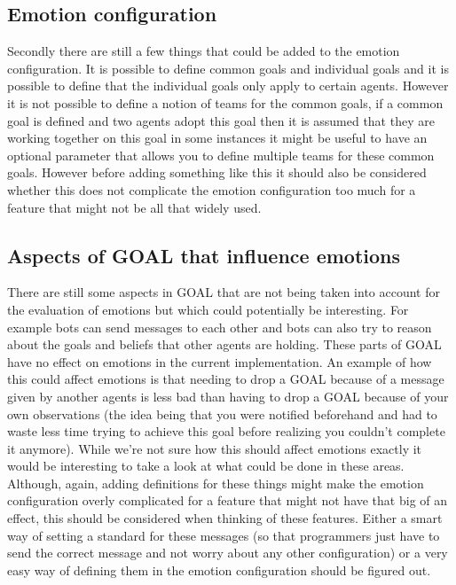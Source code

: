 \documentclass[]{article}
\begin{document}
\subsection{Emotion configuration}
Secondly there are still a few things that could be added to the emotion configuration. It is possible to define common goals and individual goals and it is possible to define that the individual goals only apply to certain agents. However it is not possible to define a notion of teams for the common goals, if a common goal is defined and two agents adopt this goal then it is assumed that they are working together on this goal in some instances it might be useful to have an optional parameter that allows you to define multiple teams for these common goals. However before adding something like this it should also be considered whether this does not complicate the emotion configuration too much for a feature that might not be all that widely used.

\subsection{Aspects of GOAL that influence emotions}
There are still some aspects in GOAL that are not being taken into account for the evaluation of emotions but which could potentially be interesting. For example bots can send messages to each other and bots can also try to reason about the goals and beliefs that other agents are holding. These parts of GOAL have no effect on emotions in the current implementation. An example of how this could affect emotions is that needing to drop a GOAL because of a message given by another agents is less bad than having to drop a GOAL because of your own observations (the idea being that you were notified beforehand and had to waste less time trying to achieve this goal before realizing you couldn't complete it anymore). While we're not sure how this should affect emotions exactly it would be interesting to take a look at what could be done in these areas. Although, again, adding definitions for these things might make the emotion configuration overly complicated for a feature that might not have that big of an effect, this should be considered when thinking of these features. Either a smart way of setting a standard for these messages (so that programmers just have to send the correct message and not worry about any other configuration) or a very easy way of defining them in the emotion configuration should be figured out.
\end{document}
